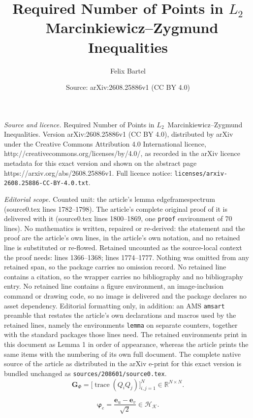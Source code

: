 \documentclass[10pt,a4paper]{amsart}
\title{Required Number of Points in $L_2$~Marcinkiewicz--Zygmund Inequalities}
\author{Felix Bartel}
\date{Source: arXiv:2608.25886v1 (CC BY 4.0)}
\DeclareMathOperator{\trace}{trace}
\begin{document}
\maketitle

\noindent\emph{Source and licence.} Required Number of Points in $L_2$~Marcinkiewicz--Zygmund Inequalities. Version arXiv:2608.25886v1 (CC BY 4.0), distributed by arXiv under the Creative Commons Attribution 4.0 International licence, http://creativecommons.org/licenses/by/4.0/, as recorded in the arXiv licence metadata for this exact version and shown on the abstract page https://arxiv.org/abs/2608.25886v1. Full licence notice: \texttt{licenses/arxiv-2608.25886-CC-BY-4.0.txt}.\par\smallskip

\noindent\textit{Editorial scope.} Counted unit: the article's lemma edgeframespectrum (source0.tex lines 1782--1798). The article's complete original proof of it is delivered with it (source0.tex lines 1800--1869, one \texttt{proof} environment of 70 lines). No mathematics is written, repaired or re-derived: the statement and the proof are the article's own lines, in the article's own notation, and no retained line is substituted or re-flowed.  Retained uncounted as the source-local context the proof needs: lines 1366--1368; lines 1774--1777.  Nothing was omitted from any retained span, so the package carries no omission record.  No retained line contains a citation, so the wrapper carries no bibliography and no bibliography entry.  No retained line contains a figure environment, an image-inclusion command or drawing code, so no image is delivered and the package declares no asset dependency.  Editorial formatting only, in addition: an AMS \texttt{amsart} preamble that restates the article's own declarations and macros used by the retained lines, namely the environments \texttt{lemma} on separate counters, together with the standard packages those lines need.  The retained environments print in this document as Lemma 1 in order of appearance, whereas the article prints the same items with the numbering of its own full document.  The complete native source of the article as distributed in the arXiv e-print for this exact version is bundled unchanged as \texttt{sources/208601/source0.tex}.
\begin{equation}\label{eq:gram}
    \bm G_\Phi = \Big[\trace(Q_iQ_j)\Big]_{i,j=1}^{N} \in\mathds R^{N\times N} .
\end{equation}

\begin{equation}\label{eq:edgeframe}
    \bm\varphi_e
    =\frac{\bm e_u-\bm e_v}{\sqrt2}\in \mathcal H_{\mathcal K}.
\end{equation}
\end{document}
